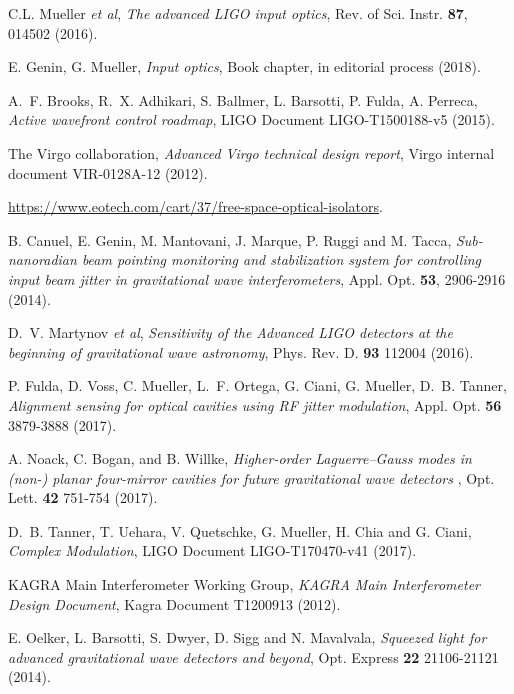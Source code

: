 \begin{thebibliography}{10}
\newcommand{\enquote}[1]{``#1''}

C.L. Mueller \emph{et al}, \emph{The advanced LIGO input optics}, Rev. of Sci. Instr. {\bf 87}, 014502 (2016).

E. Genin, G. Mueller, \emph{Input optics}, Book chapter, in editorial process (2018).

A.~F. Brooks, R.~X. Adhikari, S. Ballmer, L. Barsotti, P. Fulda, A. Perreca, \emph{Active wavefront control roadmap}, LIGO Document LIGO-T1500188-v5 (2015).

 The Virgo collaboration, \emph{Advanced Virgo technical design report}, Virgo internal document VIR-0128A-12 (2012).

 \url{https://www.eotech.com/cart/37/free-space-optical-isolators}.

 B. Canuel, E. Genin, M. Mantovani, J. Marque, P. Ruggi and M. Tacca, \emph{Sub-nanoradian beam pointing monitoring and stabilization system for controlling input beam jitter in gravitational wave interferometers}, Appl. Opt. {\bf 53}, 2906-2916 (2014).

 D.~V. Martynov \emph{et al}, \emph{Sensitivity of the Advanced LIGO detectors at the beginning of gravitational wave astronomy}, Phys. Rev. D. {\bf 93} 112004 (2016).

 P. Fulda, D. Voss, C. Mueller, L.~F. Ortega, G. Ciani, G. Mueller, D.~B. Tanner, \emph{Alignment sensing for optical cavities using RF jitter modulation}, Appl. Opt. {\bf 56} 3879-3888 (2017).

 A. Noack, C. Bogan, and B. Willke, \emph{Higher-order Laguerre–Gauss modes in (non-) planar four-mirror cavities for future gravitational wave detectors} , Opt. Lett. {\bf 42} 751-754 (2017).

 D.~B. Tanner, T. Uehara, V. Quetschke, G. Mueller, H. Chia and G. Ciani, \emph{Complex Modulation}, LIGO Document LIGO-T170470-v41 (2017). 

 KAGRA Main Interferometer Working Group, \emph{KAGRA Main Interferometer Design Document}, Kagra Document T1200913 (2012).
 
  E. Oelker, L. Barsotti, S. Dwyer, D. Sigg and N. Mavalvala, \emph{Squeezed light for advanced gravitational wave detectors and beyond}, Opt. Express {\bf 22} 21106-21121 (2014). 
 

\end{thebibliography}
